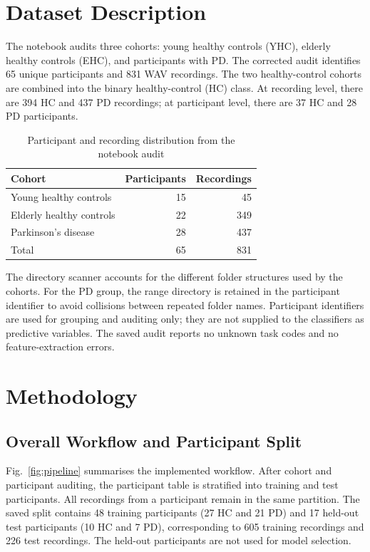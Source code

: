 \documentclass[11pt,a4paper]{article}
\begin{document}
\section{Dataset Description}
The notebook audits three cohorts: young healthy controls (YHC), elderly healthy controls (EHC), and participants with PD. The corrected audit identifies 65 unique participants and 831 WAV recordings. The two healthy-control cohorts are combined into the binary healthy-control (HC) class. At recording level, there are 394 HC and 437 PD recordings; at participant level, there are 37 HC and 28 PD participants.

\begin{table}[!t]
\centering
\caption{Participant and recording distribution from the notebook audit}
\label{tab:dataset}
\begin{tabular}{lrr}
\toprule
Cohort & Participants & Recordings\\
\midrule
Young healthy controls & 15 & 45\\
Elderly healthy controls & 22 & 349\\
Parkinson's disease & 28 & 437\\
\midrule
Total & 65 & 831\\
\bottomrule
\end{tabular}
\end{table}

The directory scanner accounts for the different folder structures used by the cohorts. For the PD group, the range directory is retained in the participant identifier to avoid collisions between repeated folder names. Participant identifiers are used for grouping and auditing only; they are not supplied to the classifiers as predictive variables. The saved audit reports no unknown task codes and no feature-extraction errors.

\section{Methodology}
\subsection{Overall Workflow and Participant Split}
Fig.~\ref{fig:pipeline} summarises the implemented workflow. After cohort and participant auditing, the participant table is stratified into training and test participants. All recordings from a participant remain in the same partition. The saved split contains 48 training participants (27 HC and 21 PD) and 17 held-out test participants (10 HC and 7 PD), corresponding to 605 training recordings and 226 test recordings. The held-out participants are not used for model selection.
\end{document}

